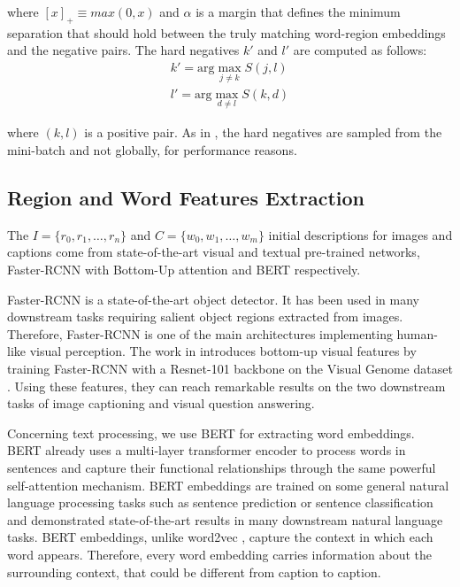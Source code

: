 \documentclass[acmsmall]{acmart}
\begin{document}
where $[x]_+ \equiv max(0, x)$ and $\alpha$ is a margin that defines the minimum separation that should hold between the truly matching word-region embeddings and the negative pairs. The hard negatives ${k}'$ and ${l}'$ are computed as follows: 
\begin{equation}
\begin{split}
    {k}' = \text{arg} \max_{j \neq k} S(j, l) \\
    {l}' = \text{arg} \max_{d \neq l} S(k, d)
\end{split}
\end{equation}

where $(k, l)$ is a positive pair.
As in \cite{vsepp2018faghri}, the hard negatives are sampled from the mini-batch and not globally, for performance reasons.

\subsection{Region and Word Features Extraction}
The $I = \{r_0, r_1, \ldots, r_n\}$ and $C = \{w_0, w_1, \ldots, w_m\}$ initial descriptions for images and captions come from state-of-the-art visual and textual pre-trained networks, Faster-RCNN with Bottom-Up attention and BERT respectively.

Faster-RCNN \cite{RenHGS15fasterrcnn} is a state-of-the-art object detector. It has been used in many downstream tasks requiring salient object regions extracted from images. 
Therefore, Faster-RCNN is one of the main architectures implementing human-like visual perception.
The work in \cite{Anderson2018bottomup} introduces bottom-up visual features by training Faster-RCNN with a Resnet-101 backbone on the Visual Genome dataset \cite{Krishna2016VisualGenome}. Using these features, they can reach remarkable results on the two downstream tasks of image captioning and visual question answering.



Concerning text processing, we use BERT \cite{devlin2019bert} for extracting word embeddings. BERT already uses a multi-layer transformer encoder to process words in sentences and capture their functional relationships through the same powerful self-attention mechanism. BERT embeddings are trained on some general natural language processing tasks such as sentence prediction or sentence classification and demonstrated state-of-the-art results in many downstream natural language tasks.
BERT embeddings, unlike word2vec \cite{Mikolov2013word2vec}, capture the context in which each word appears. Therefore, every word embedding carries information about the surrounding context, that could be different from caption to caption.
\end{document}
